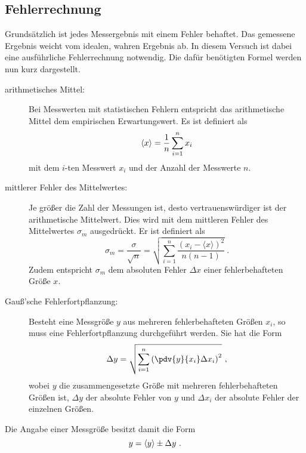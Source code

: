%
\subsection{Fehlerrechnung}
%
Grundsätzlich ist jedes Messergebnis mit einem Fehler behaftet. Das gemessene
Ergebnis weicht vom idealen, wahren Ergebnis ab. In diesem Versuch ist dabei
eine ausführliche Fehlerrechnung notwendig.  Die dafür benötigten Formel werden
nun kurz dargestellt.
\begin{description}
  \item[arithmetisches Mittel:] Bei Messwerten mit statistischen Fehlern
    entspricht das arithmetische Mittel dem empirischen Erwartungswert.
    Es ist definiert als
  \begin{equation}
    \langle x \rangle = \frac{1}{n} \sum_{i = 1}^n x_i
    \label{eq:Mittelwert}\\
  \end{equation}
  mit dem $i$-ten Messwert $x_i$ und der Anzahl der Messwerte $n$.
  \item[mittlerer Fehler des Mittelwertes:] Je größer die Zahl der Messungen
    ist, desto vertrauenswürdiger ist der arithmetische Mittelwert.
    Dies wird mit dem mittleren Fehler des Mittelwertes $\sigma_m$ ausgedrückt.
    Er ist definiert als
  \begin{equation}
    \sigma_m = \frac{\sigma}{\sqrt{n}} =
    \sqrt{\sum_{i = 1}^n \frac{(x_i - \langle x \rangle)^2}{n(n-1)}}~.
    \label{eq:absloluter_Fehler}
  \end{equation}
  Zudem entspricht $\sigma_m$ dem absoluten Fehler $\Delta x$ einer
  fehlerbehafteten Größe $x$.
  \item[Gauß'sche Fehlerfortpflanzung:] Besteht eine Messgröße $y$ aus mehreren
    fehlerbehafteten Größen $x_i$, so muss eine Fehlerfortpflanzung
    durchgeführt werden. Sie hat die Form
  \begin{equation}
    \Delta y =
    \sqrt{\sum_{i = 1}^n \left(\pdv{y}{x_i} \Delta x_i  \right)^2}~,
    \label{Gauss}
  \end{equation}
  wobei $y$ die zusammengesetzte Größe mit mehreren fehlerbehafteten Größen
  ist, $\Delta y$ der absolute Fehler von $y$ und $\Delta x_i$ der absolute
  Fehler der einzelnen Größen.
\end{description}
%
Die Angabe einer Messgröße besitzt damit die Form
\begin{equation}
  y = \langle y \rangle \pm \Delta y~. \notag
\end{equation}
%
%
\clearpage
